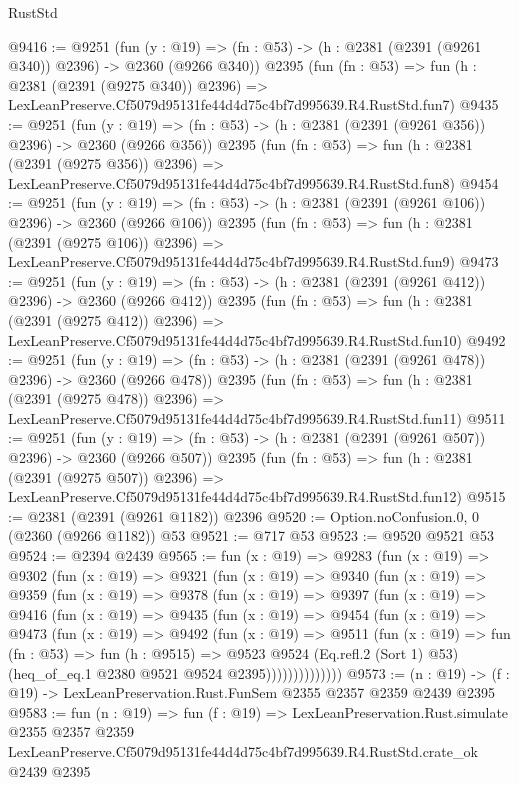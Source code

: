 \begin{lexlean}{RustStd}
\begin{coremodule}
@9416 := @9251
    (fun (y : @19) => (fn : @53) -> (h : @2381 (@2391 (@9261 @340)) @2396) -> @2360 (@9266 @340))
    @2395
    (fun (fn : @53) =>
    fun (h : @2381 (@2391 (@9275 @340)) @2396) =>
    LexLeanPreserve.Cf5079d95131fe44d4d75c4bf7d995639.R4.RustStd.fun7)
@9435 := @9251
    (fun (y : @19) => (fn : @53) -> (h : @2381 (@2391 (@9261 @356)) @2396) -> @2360 (@9266 @356))
    @2395
    (fun (fn : @53) =>
    fun (h : @2381 (@2391 (@9275 @356)) @2396) =>
    LexLeanPreserve.Cf5079d95131fe44d4d75c4bf7d995639.R4.RustStd.fun8)
@9454 := @9251
    (fun (y : @19) => (fn : @53) -> (h : @2381 (@2391 (@9261 @106)) @2396) -> @2360 (@9266 @106))
    @2395
    (fun (fn : @53) =>
    fun (h : @2381 (@2391 (@9275 @106)) @2396) =>
    LexLeanPreserve.Cf5079d95131fe44d4d75c4bf7d995639.R4.RustStd.fun9)
@9473 := @9251
    (fun (y : @19) => (fn : @53) -> (h : @2381 (@2391 (@9261 @412)) @2396) -> @2360 (@9266 @412))
    @2395
    (fun (fn : @53) =>
    fun (h : @2381 (@2391 (@9275 @412)) @2396) =>
    LexLeanPreserve.Cf5079d95131fe44d4d75c4bf7d995639.R4.RustStd.fun10)
@9492 := @9251
    (fun (y : @19) => (fn : @53) -> (h : @2381 (@2391 (@9261 @478)) @2396) -> @2360 (@9266 @478))
    @2395
    (fun (fn : @53) =>
    fun (h : @2381 (@2391 (@9275 @478)) @2396) =>
    LexLeanPreserve.Cf5079d95131fe44d4d75c4bf7d995639.R4.RustStd.fun11)
@9511 := @9251
    (fun (y : @19) => (fn : @53) -> (h : @2381 (@2391 (@9261 @507)) @2396) -> @2360 (@9266 @507))
    @2395
    (fun (fn : @53) =>
    fun (h : @2381 (@2391 (@9275 @507)) @2396) =>
    LexLeanPreserve.Cf5079d95131fe44d4d75c4bf7d995639.R4.RustStd.fun12)
@9515 := @2381 (@2391 (@9261 @1182)) @2396
@9520 := Option.noConfusion.{0, 0} (@2360 (@9266 @1182)) @53
@9521 := @717 @53
@9523 := @9520 @9521 @53
@9524 := @2394 @2439
@9565 := fun (x : @19) =>
  @9283
    (fun (x : @19) =>
    @9302
      (fun (x : @19) =>
      @9321
        (fun (x : @19) =>
        @9340
          (fun (x : @19) =>
          @9359
            (fun (x : @19) =>
            @9378
              (fun (x : @19) =>
              @9397
                (fun (x : @19) =>
                @9416
                  (fun (x : @19) =>
                  @9435
                    (fun (x : @19) =>
                    @9454
                      (fun (x : @19) =>
                      @9473
                        (fun (x : @19) =>
                        @9492
                          (fun (x : @19) =>
                          @9511
                            (fun (x : @19) =>
                            fun (fn : @53) =>
                            fun (h : @9515) =>
                            @9523
                              @9524
                              (Eq.refl.{2} (Sort 1) @53)
                              (heq_of_eq.{1} @2380 @9521 @9524 @2395))))))))))))))
@9573 := (n : @19) -> (f : @19) -> LexLeanPreservation.Rust.FunSem @2355 @2357 @2359 @2439 @2395
@9583 := fun (n : @19) =>
  fun (f : @19) =>
  LexLeanPreservation.Rust.simulate
    @2355
    @2357
    @2359
    LexLeanPreserve.Cf5079d95131fe44d4d75c4bf7d995639.R4.RustStd.crate_ok
    @2439
    @2395
\end{coremodule}
\end{lexlean}
